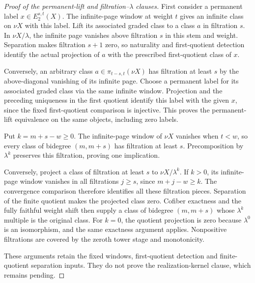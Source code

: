 \begin{proof}[Proof of the permanent-lift and filtration--$\lambda$ clauses]
First consider a permanent label $x\in E_2^{s,t}(X)$. The infinite-page
window at weight $t$ gives an infinite class on $\nu X$ with this
label. Lift its associated graded class to a class $a$ in filtration
$s$. In $\nu X/\lambda$, the infinite page vanishes above filtration
$s$ in this stem and weight. Separation makes filtration $s+1$ zero,
so naturality and first-quotient detection identify the actual
projection of $a$ with the prescribed first-quotient class of $x$.

Conversely, an arbitrary class $a\in\pi_{t-s,t}(\nu X)$ has
filtration at least $s$ by the above-diagonal vanishing of its infinite
page. Choose a permanent label for its associated graded class via
the same infinite window. Projection and the preceding uniqueness in
the first quotient identify this label with the given $x$, since the
fixed first-quotient comparison is injective. This proves the
permanent-lift equivalence on the same objects, including zero labels.

Put $k=m+s-w\ge0$. The infinite-page window of $\nu X$ vanishes when
$t<w$, so every class of bidegree $(m,m+s)$ has filtration at least
$s$. Precomposition by $\lambda^k$ preserves this filtration, proving
one implication.

Conversely, project a class of filtration at least $s$ to
$\nu X/\lambda^k$. If $k>0$, its infinite-page window vanishes in all
filtrations $j\ge s$, since $m+j-w\ge k$. The convergence comparison
therefore identifies all these filtration pieces. Separation of the
finite quotient makes the projected class zero. Cofiber exactness and
the fully faithful weight shift then supply a class of bidegree
$(m,m+s)$ whose $\lambda^k$ multiple is the original class. For $k=0$,
the quotient projection is zero because $\lambda^0$ is an isomorphism,
and the same exactness argument applies. Nonpositive filtrations are
covered by the zeroth tower stage and monotonicity.

These arguments retain the fixed windows, first-quotient detection and
finite-quotient separation inputs. They do not prove the
realization-kernel clause, which remains pending.
\end{proof}

